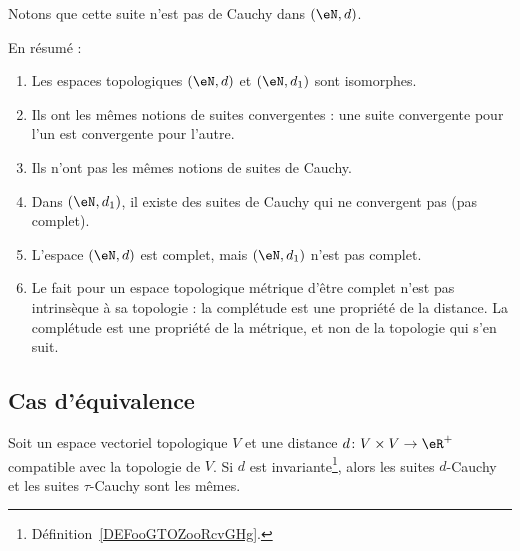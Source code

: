 \begin{example}
    Notons que cette suite n'est pas de Cauchy dans \( (\eN,d)\).

    En résumé :
    \begin{enumerate}
        \item
            Les espaces topologiques \( (\eN,d)\) et \( (\eN,d_1)\) sont isomorphes.
        \item
            Ils ont les mêmes notions de suites convergentes : une suite convergente pour l'un est convergente pour l'autre.
        \item
            Ils n'ont pas les mêmes notions de suites de Cauchy.
        \item
            Dans \(  (\eN,d_1)  \), il existe des suites de Cauchy qui ne convergent pas (pas complet).
        \item
            L'espace \( (\eN,d)\) est complet, mais \( (\eN,d_1)\) n'est pas complet.
        \item
            Le fait pour un espace topologique métrique d'être complet n'est pas intrinsèque à sa topologie : la complétude est une propriété de la distance. La complétude est une propriété de la métrique, et non de la topologie qui s'en suit.
    \end{enumerate}
\end{example}

\subsection{Cas d'équivalence}

\begin{lemma}       \label{LEMooIAHSooFkXjvr}
    Soit un espace vectoriel topologique \( V\) et une distance \( d\colon V\times V\to \eR^+\) compatible avec la topologie de \( V\). Si \( d\) est invariante\footnote{Définition~\ref{DEFooGTOZooRcvGHg}.}, alors les suites \( d\)-Cauchy et les suites \( \tau\)-Cauchy sont les mêmes.
\end{lemma}


